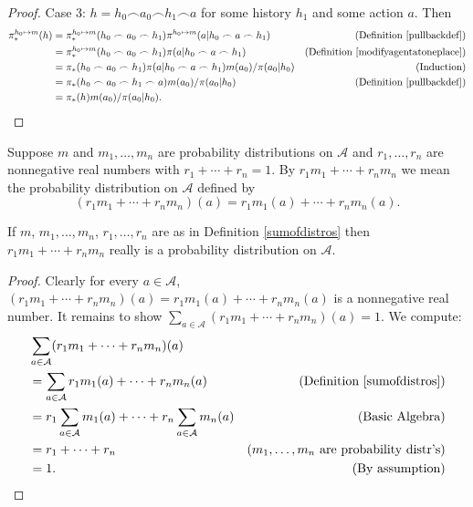 \documentclass[runningheads]{llncs}
\begin{document}
\begin{proof}
    Case 3: $h=h_0\frown a_0\frown h_1\frown a$ for some history $h_1$
        and some action $a$. Then
    \begin{align*}
        \pi^{h_0\mapsto m}_*(h)
        &= \pi^{h_0\mapsto m}_*(h_0\frown a_0\frown h_1)
            \pi^{h_0\mapsto m}(a|h_0\frown a\frown h_1)
            &\mbox{(Definition \ref{pullbackdef})}\\
        &= \pi^{h_0\mapsto m}_*(h_0\frown a_0\frown h_1)
            \pi(a|h_0\frown a\frown h_1)
            &\mbox{(Definition \ref{modifyagentatoneplace})}\\
        &= \pi_*(h_0\frown a_0\frown h_1)\pi(a|h_0\frown a\frown h_1)m(a_0)/\pi(a_0|h_0)
            &\mbox{(Induction)}\\
        &= \pi_*(h_0\frown a_0\frown h_1\frown a)m(a_0)/\pi(a_0|h_0)
            &\mbox{(Definition \ref{pullbackdef})}\\
        &= \pi_*(h)m(a_0)/\pi(a_0|h_0).
    \end{align*}
\end{proof}

\begin{definition}
\label{sumofdistros}
    Suppose $m$ and $m_1,\ldots,m_n$ are probability distributions on $\mathcal A$
    and $r_1,\ldots,r_n$ are nonnegative real numbers with
    $r_1+\cdots+r_n=1$. By $r_1m_1+\cdots+r_nm_n$ we mean the probability distribution
    on $\mathcal A$ defined by
    \[
        (r_1m_1+\cdots+r_nm_n)(a) = r_1m_1(a) + \cdots + r_nm_n(a).
    \]
\end{definition}

\begin{lemma}
    If $m$, $m_1,\ldots,m_n$, $r_1,\ldots,r_n$ are as in Definition \ref{sumofdistros}
    then $r_1m_1+\cdots+r_nm_n$ really is a probability distribution on $\mathcal A$.
\end{lemma}

\begin{proof}
    Clearly for every $a\in\mathcal A$,
    $(r_1m_1+\cdots+r_nm_n)(a) = r_1m_1(a) + \cdots + r_nm_n(a)$ is a nonnegative
    real number. It remains to show $\sum_{a\in\mathcal A}(r_1m_1+\cdots+r_nm_n)(a)=1$.
    We compute:
    \begin{align*}
        &{} \sum_{a\in\mathcal A}(r_1m_1+\cdots+r_nm_n)(a)\\
        &=
        \sum_{a\in\mathcal A} r_1m_1(a) + \cdots + r_nm_n(a)
            &\mbox{(Definition \ref{sumofdistros})}\\
        &=
        r_1\sum_{a\in\mathcal A} m_1(a) + \cdots + r_n\sum_{a\in\mathcal A}m_n(a)
            &\mbox{(Basic Algebra)}\\
        &= r_1 + \cdots + r_n
            &\mbox{($m_1,\ldots,m_n$ are probability distr's)}\\
        &= 1.
            &\mbox{(By assumption)}
    \end{align*}
\end{proof}
\end{document}
